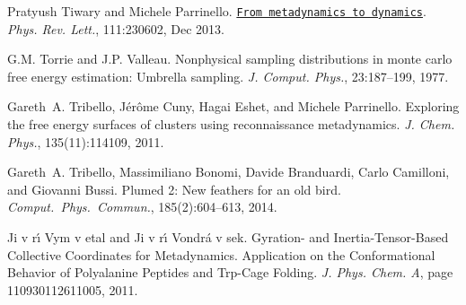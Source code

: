 \begin{DoxyDescription}
\item[\label{_CITEREF_PRL230602}%
\mbox{[}33\mbox{]}]Pratyush Tiwary and Michele Parrinello. \href{http://link.aps.org/doi/10.1103/PhysRevLett.111.230602}{\tt From metadynamics to dynamics}. {\itshape Phys. Rev. Lett.}, 111\+:230602, Dec 2013. 


\item[\label{_CITEREF_torrie-valleau}%
\mbox{[}34\mbox{]}]G.\+M. Torrie and J.\+P. Valleau. Nonphysical sampling distributions in monte carlo free energy estimation\+: Umbrella sampling. {\itshape J. Comput. Phys.}, 23\+:187--199, 1977.


\item[\label{_CITEREF_lj-recon}%
\mbox{[}35\mbox{]}]Gareth~A. Tribello, Jérôme Cuny, Hagai Eshet, and Michele Parrinello. Exploring the free energy surfaces of clusters using reconnaissance metadynamics. {\itshape J. Chem. Phys.}, 135(11)\+:114109, 2011.


\item[\label{_CITEREF_plumed2}%
\mbox{[}36\mbox{]}]Gareth~A. Tribello, Massimiliano Bonomi, Davide Branduardi, Carlo Camilloni, and Giovanni Bussi. Plumed 2\+: New feathers for an old bird. {\itshape Comput.~Phys.~Commun.}, 185(2)\+:604--613, 2014.


\item[\label{_CITEREF_Vymetal:2011gv}%
\mbox{[}37\mbox{]}]Ji v r\'{\i} Vym v etal and Ji v r\'{\i} Vondr\'{a} v sek. Gyration-\/ and Inertia-\/\+Tensor-\/\+Based Collective Coordinates for Metadynamics. Application on the Conformational Behavior of Polyalanine Peptides and Trp-\/\+Cage Folding. {\itshape J. Phys. Chem. A}, page 110930112611005, 2011.


\end{DoxyDescription}